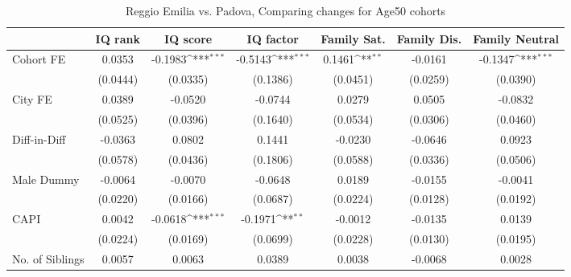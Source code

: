 \begin{table}[htbp]\centering
\def\sym#1{\ifmmode^{#1}\else\(^{#1}\)\fi}
\caption{Reggio Emilia vs. Padova, Comparing changes for Age50 cohorts}
\begin{tabular}{l*{6}{c}}
\toprule
            &\multicolumn{1}{c}{IQ rank}&\multicolumn{1}{c}{IQ score}&\multicolumn{1}{c}{IQ factor}&\multicolumn{1}{c}{Family Sat.}&\multicolumn{1}{c}{Family Dis.}&\multicolumn{1}{c}{Family Neutral}\\
\midrule
Cohort FE   &      0.0353         &     -0.1983\sym{***}&     -0.5143\sym{***}&      0.1461\sym{**} &     -0.0161         &     -0.1347\sym{***}\\
            &    (0.0444)         &    (0.0335)         &    (0.1386)         &    (0.0451)         &    (0.0259)         &    (0.0390)         \\
\addlinespace
City FE     &      0.0389         &     -0.0520         &     -0.0744         &      0.0279         &      0.0505         &     -0.0832         \\
            &    (0.0525)         &    (0.0396)         &    (0.1640)         &    (0.0534)         &    (0.0306)         &    (0.0460)         \\
\addlinespace
Diff-in-Diff&     -0.0363         &      0.0802         &      0.1441         &     -0.0230         &     -0.0646         &      0.0923         \\
            &    (0.0578)         &    (0.0436)         &    (0.1806)         &    (0.0588)         &    (0.0336)         &    (0.0506)         \\
\addlinespace
Male Dummy  &     -0.0064         &     -0.0070         &     -0.0648         &      0.0189         &     -0.0155         &     -0.0041         \\
            &    (0.0220)         &    (0.0166)         &    (0.0687)         &    (0.0224)         &    (0.0128)         &    (0.0192)         \\
\addlinespace
CAPI        &      0.0042         &     -0.0618\sym{***}&     -0.1971\sym{**} &     -0.0012         &     -0.0135         &      0.0139         \\
            &    (0.0224)         &    (0.0169)         &    (0.0699)         &    (0.0228)         &    (0.0130)         &    (0.0195)         \\
\addlinespace
No. of Siblings&      0.0057         &      0.0063         &      0.0389         &      0.0038         &     -0.0068         &      0.0028         \\

\end{tabular}
\end{table}
